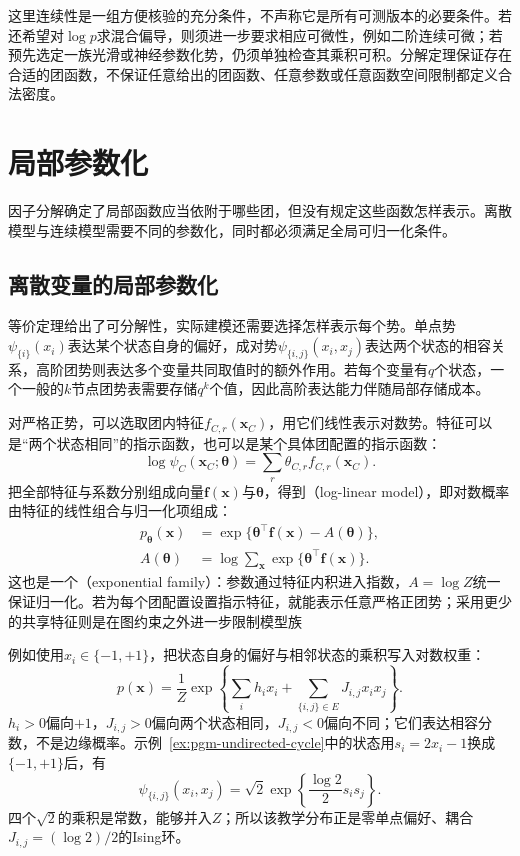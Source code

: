 这里连续性是一组方便核验的充分条件，不声称它是所有可测版本的必要条件。若还希望对$\log p$求混合偏导，则须进一步要求相应可微性，例如二阶连续可微；若预先选定一族光滑或神经参数化势，仍须单独检查其乘积可积。分解定理保证存在合适的团函数，不保证任意给出的团函数、任意参数或任意函数空间限制都定义合法密度。

\section{局部参数化}
\label{sec:pgm-undirected-local-parameterization}

因子分解确定了局部函数应当依附于哪些团，但没有规定这些函数怎样表示。离散模型与连续模型需要不同的参数化，同时都必须满足全局可归一化条件。

\subsection{离散变量的局部参数化}
\label{sec:pgm-undirected-discrete-parameterization}

等价定理给出了可分解性，实际建模还需要选择怎样表示每个势。单点势$\psi_{\{i\}}(x_i)$表达某个状态自身的偏好，成对势$\psi_{\{i,j\}}(x_i,x_j)$表达两个状态的相容关系，高阶团势则表达多个变量共同取值时的额外作用。若每个变量有$q$个状态，一个一般的$k$节点团势表需要存储$q^k$个值，因此高阶表达能力伴随局部存储成本。

对严格正势，可以选取团内特征$f_{C,r}(\bm{x}_C)$，用它们线性表示对数势。特征可以是“两个状态相同”的指示函数，也可以是某个具体团配置的指示函数：
\[
  \log\psi_C(\bm{x}_C;\bm{\theta})
  =\sum_r\theta_{C,r}f_{C,r}(\bm{x}_C).
\]
把全部特征与系数分别组成向量$\bm{f}(\bm{x})$与$\bm{\theta}$，得到（log-linear model），即对数概率由特征的线性组合与归一化项组成：
\begin{equation}
  \begin{aligned}
    p_{\bm{\theta}}(\bm{x})
      &=\exp\{\bm{\theta}^{\top}\bm{f}(\bm{x})-A(\bm{\theta})\},\\
    A(\bm{\theta})
      &=\log\sum_{\bm{x}}
          \exp\{\bm{\theta}^{\top}\bm{f}(\bm{x})\}.
  \end{aligned}
  \label{eq:pgm-undirected-exponential-family}
\end{equation}
这也是一个（exponential family）：参数通过特征内积进入指数，$A=\log Z$统一保证归一化。若为每个团配置设置指示特征，就能表示任意严格正团势；采用更少的共享特征则是在图约束之外进一步限制模型族

例如使用$x_i\in\{-1,+1\}$，把状态自身的偏好与相邻状态的乘积写入对数权重：
\begin{equation}
  p(\bm{x})=\frac{1}{Z}
  \exp\left\{\sum_i h_i x_i+
             \sum_{\{i,j\}\in E}J_{i,j}x_i x_j\right\}.
  \label{eq:pgm-undirected-ising}
\end{equation}
$h_i>0$偏向$+1$，$J_{i,j}>0$偏向两个状态相同，$J_{i,j}<0$偏向不同；它们表达相容分数，不是边缘概率。示例~\ref{ex:pgm-undirected-cycle}中的状态用$s_i=2x_i-1$换成$\{-1,+1\}$后，有
\[
  \psi_{\{i,j\}}(x_i,x_j)
  =\sqrt{2}\exp\left\{\frac{\log2}{2}s_i s_j\right\}.
\]
四个$\sqrt{2}$的乘积是常数，能够并入$Z$；所以该教学分布正是零单点偏好、耦合$J_{i,j}=(\log2)/2$的Ising环。


